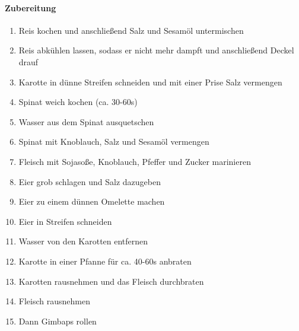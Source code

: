 \paragraph{Zubereitung}
\begin{enumerate}[noitemsep]
	\item Reis kochen und anschließend Salz und Sesamöl untermischen 
	\item Reis abkühlen lassen, sodass er nicht mehr dampft und anschließend Deckel drauf
	\item Karotte in dünne Streifen schneiden und mit einer Prise Salz vermengen
	\item Spinat weich kochen (ca. 30-60s)
	\item Wasser aus dem Spinat ausquetschen
	\item Spinat mit Knoblauch, Salz und Sesamöl vermengen
	\item Fleisch mit Sojasoße, Knoblauch, Pfeffer und Zucker marinieren
	\item Eier grob schlagen und Salz dazugeben 
	\item Eier zu einem dünnen Omelette machen
	\item Eier in Streifen schneiden
	\item Wasser von den Karotten entfernen
	\item Karotte in einer Pfanne für ca. 40-60s anbraten 
	\item Karotten rausnehmen und das Fleisch durchbraten
	\item Fleisch rausnehmen
	\item Dann Gimbaps rollen
\end{enumerate}

